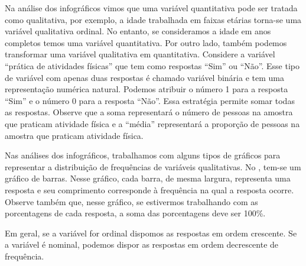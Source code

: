 \begin{observation}

Na análise dos infográficos vimos que uma variável quantitativa pode ser tratada como qualitativa, por exemplo, a idade trabalhada em faixas etárias torna-se uma variável qualitativa ordinal. No entanto, se consideramos a idade em anos completos temos uma variável quantitativa. Por outro lado, também podemos transformar uma variável qualitativa em quantitativa. Considere a variável ``prática de atividades físicas'' que tem como respostas ``Sim'' ou ``Não''. Esse tipo de variável com apenas duas respostas é chamado variável binária e tem uma representação numérica natural. Podemos atribuir o número 1 para a resposta ``Sim'' e o número 0 para a resposta ``Não''. Essa estratégia permite somar todas as respostas. Observe que a soma representará o número de pessoas na amostra que praticam atividade física e a ``média'' representará a proporção de pessoas na amostra que praticam atividade física.
\end{observation}


Nas análises dos infográficos, trabalhamos com alguns tipos de gráficos para representar a distribuição de frequências de variáveis qualitativas. No {\hyperref[\detokenize{PE103-0:fig-infografico-pnad-3}]{}}, tem-se um gráfico de barras. Nesse gráfico, cada barra, de mesma largura, representa uma resposta e seu comprimento corresponde à frequência na qual a resposta ocorre. Observe também que, nesse gráfico, se estivermos trabalhando com as porcentagens de cada resposta, a soma das porcentagens deve ser 100\%.

Em geral, se a variável for ordinal dispomos as respostas em ordem crescente. Se a variável é nominal, podemos dispor as respostas em ordem decrescente de frequência.

